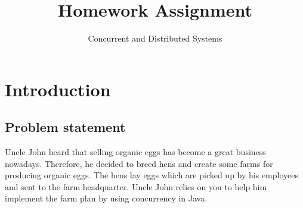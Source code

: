 \documentclass{article}
\title{\textbf{ Homework Assignment}}
\author{Concurrent and Distributed Systems}
\date{Student: Julia Florea

Calculatoare Engleza

Anul III, Grupa 3.2 A

Facultatea de Calculatoare, Automatică și Electronică}
\begin{document}
\maketitle
\vspace{10cm}
\textbf{ }
\textbf{}

\newpage






\section{Introduction}
\subsection{Problem statement}
Uncle John heard that selling organic eggs has become a great business nowadays. Therefore, he
decided to breed hens and create some farms for producing organic eggs. The hens lay eggs
which are picked up by his employees and sent to the farm headquarter.
Uncle John relies on you to help him implement the farm plan by using concurrency in Java.
\end{document}
